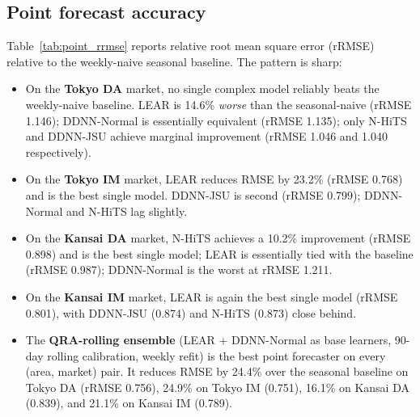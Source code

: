 \documentclass[review,3p,times,authoryear]{elsarticle}
\begin{document}
\subsection{Point forecast accuracy}\label{sec:point_results}

Table~\ref{tab:point_rrmse} reports relative root mean square error (rRMSE) relative to the weekly-naive seasonal baseline. The pattern is sharp:

\begin{itemize}\itemsep0pt
\item On the \textbf{Tokyo DA} market, no single complex model reliably beats the weekly-naive baseline. LEAR is 14.6\% \emph{worse} than the seasonal-naive (rRMSE 1.146); DDNN-Normal is essentially equivalent (rRMSE 1.135); only N-HiTS and DDNN-JSU achieve marginal improvement (rRMSE 1.046 and 1.040 respectively).
\item On the \textbf{Tokyo IM} market, LEAR reduces RMSE by 23.2\% (rRMSE 0.768) and is the best single model. DDNN-JSU is second (rRMSE 0.799); DDNN-Normal and N-HiTS lag slightly.
\item On the \textbf{Kansai DA} market, N-HiTS achieves a 10.2\% improvement (rRMSE 0.898) and is the best single model; LEAR is essentially tied with the baseline (rRMSE 0.987); DDNN-Normal is the worst at rRMSE 1.211.
\item On the \textbf{Kansai IM} market, LEAR is again the best single model (rRMSE 0.801), with DDNN-JSU (0.874) and N-HiTS (0.873) close behind.
\item The \textbf{QRA-rolling ensemble} (LEAR + DDNN-Normal as base learners, 90-day rolling calibration, weekly refit) is the best point forecaster on every (area, market) pair. It reduces RMSE by 24.4\% over the seasonal baseline on Tokyo DA (rRMSE 0.756), 24.9\% on Tokyo IM (0.751), 16.1\% on Kansai DA (0.839), and 21.1\% on Kansai IM (0.789).
\end{itemize}
\end{document}
